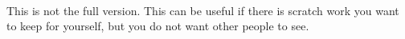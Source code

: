 \documentclass[12pt]{amsart}
\numberwithin{equation}{section}
\theoremstyle{definition}
\theoremstyle{remark}
\newif\ifnotes
\begin{document}

\ \newpage

\ifnotes


\else
	This is not the full version.  This can be useful if there is scratch work you want to keep for yourself, but you do not want other people to see. 
\fi





\end{document}
